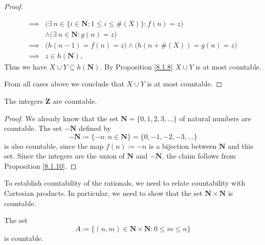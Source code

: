 \begin{proof}
\begin{itemize}
\begin{align*}
                  \implies & \big(\exists\ n \in \{i \in \mathbf{N} : 1 \leq i \leq \#(X)\} : f(n) = z\big) \\
                           & \land \big(\exists\ n \in \mathbf{N} : g(n) = z\big)                           \\
                  \implies & \big(h(n - 1) = f(n) = z\big) \land \big(h(n + \#(X)) = g(n) = z\big)          \\
                  \implies & z \in h(\mathbf{N}),
              \end{align*}
              Thus we have \(X \cup Y \subseteq h(\mathbf{N})\).
              By Proposition \ref{8.1.8} \(X \cup Y\) is at most countable.
    \end{itemize}
    From all cases above we conclude that \(X \cup Y\) is at most countable.
\end{proof}

\begin{corollary}\label{8.1.11}
    The integers \(\mathbf{Z}\) are countable.
\end{corollary}

\begin{proof}
    We already know that the set \(\mathbf{N} = \{0, 1, 2, 3, \dots\}\) of natural numbers are countable.
    The set \(-\mathbf{N}\) defined by
    \[
        -\mathbf{N} \coloneqq \{-n : n \in \mathbf{N}\} = \{0, -1, -2, -3, \dots\}
    \]
    is also countable, since the map \(f(n) \coloneqq -n\) is a bijection between \(\mathbf{N}\) and this set.
    Since the integers are the union of \(\mathbf{N}\) and \(-\mathbf{N}\), the claim follows from Proposition \ref{8.1.10}.
\end{proof}

\begin{note}
    To establish countability of the rationals, we need to relate countability with Cartesian products.
    In particular, we need to show that the set \(\mathbf{N} \times \mathbf{N}\) is countable.
\end{note}

\begin{lemma}\label{8.1.12}
    The set
    \[
        A \coloneqq \{(n, m) \in \mathbf{N} \times \mathbf{N} : 0 \leq m \leq n\}
    \]
    is countable.
\end{lemma}

